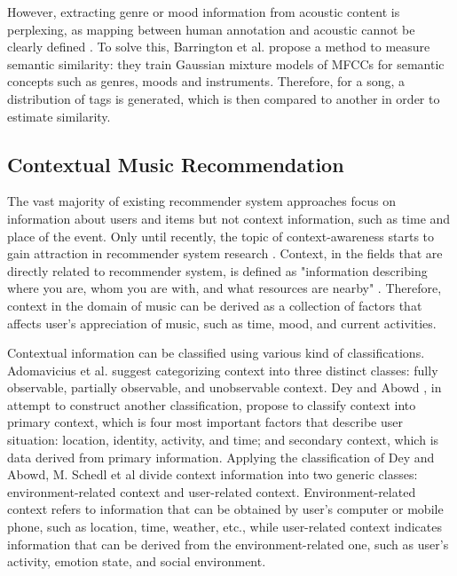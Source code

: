However, extracting genre or mood information from acoustic content is perplexing, as mapping between human annotation and acoustic cannot be clearly defined \cite{aucouturier2009sounds}. To solve this,  Barrington et al. \cite{barrington2009smarter} propose a method to measure semantic similarity: they train Gaussian mixture models of MFCCs for semantic concepts such as genres, moods and instruments. Therefore, for a song, a distribution of tags is generated, which is then compared to another in order to estimate similarity. 

\subsection{Contextual Music Recommendation}
The vast majority of existing recommender system approaches focus on information about users and items but not context information, such as time and place of the event. Only until recently, the topic of context-awareness starts to gain attraction in recommender system research \cite{adomavicius2011context}. Context, in the fields that are directly related to recommender system, is defined as "information describing where you are, whom you are with, and what resources are nearby" \cite{schilit1994context}. Therefore, context in the domain of music can be derived as a collection of factors that affects user's appreciation of music, such as time, mood, and current activities.

Contextual information can be classified using various kind of classifications. Adomavicius et al. \cite{adomavicius2011context} suggest categorizing context into three distinct classes: fully observable, partially observable, and unobservable context. Dey and Abowd \cite{abowd1999towards}, in attempt to construct another classification, propose to classify context into primary context, which is four most important factors that describe user situation: location, identity, activity, and time; and secondary context, which is data derived from primary information. Applying the classification of Dey and Abowd, M. Schedl et al \cite{schedl2015music} divide context information into two generic classes: environment-related context and user-related context. Environment-related context refers to information that can be obtained by user's computer or mobile phone, such as location, time, weather, etc., while user-related context indicates information that can be derived from the environment-related one, such as user's activity, emotion state, and social environment. 

